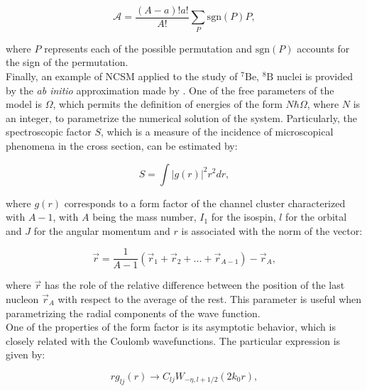 \documentclass[openany]{book}
\begin{document}
\begin{equation}\label{eq:micro_noCoreShell_antisymmetrization}
	\mathcal{A} = \frac{(A - a)! a!}{A!}  \sum_{P} \mathrm{sgn} (P) P,
\end{equation}

where $P$ represents each of the possible permutation and $\mathrm{sgn}(P)$ accounts for the sign of the permutation. \\ 

Finally, an example of NCSM applied to the study of  $\mathrm{{}^{7}Be}$,  $\mathrm{{}^{8}B}$ nuclei is provided by the \textit{ab initio} approximation made by  \cite{navratil_bertulani_caurier_2006}. One of the free parameters of the model is $\Omega$, which permits the definition of energies of the form $N\hbar \Omega$, where $N$ is an integer, to parametrize the numerical solution of the system. Particularly, the spectroscopic factor $S$, which is a measure of the incidence of microscopical phenomena in the cross section, can be estimated by: 

\begin{equation}\label{eq:micro_NCSH_application_S}
	S = \int { \left| g (r) \right|^2 r^2 dr },
\end{equation}

where $g(r)$ corresponds to a form factor of the channel cluster characterized with $A - 1$, with $A$ being the mass number, $I_1$ for the isospin, $l$ for the orbital and $J$ for the angular momentum and $r$ is associated with the norm of the vector: 

\begin{equation}\label{eq:micro_NCSH_application_r}
	\vec r  = \frac{1} {A - 1}( \vec r_1 + \vec r_2 + ... + \vec r_{A-1}) - \vec r_A,
\end{equation}

where $\vec r$ has the role of the relative difference between the position of the last nucleon $\vec r_A$ with respect to the average of the rest. This parameter is useful when parametrizing the radial components of the wave function. \\

One of the properties of the form factor is its asymptotic behavior, which is closely related with the Coulomb wavefunctions. The particular expression is given by: 

\begin{equation}\label{eq:micro_NCSH_application_asymptotics}
	r g_{lj}(r) \rightarrow C_{lj} W_{-\eta , l + 1/2} (2k_0r), 
\end{equation}
\end{document}

